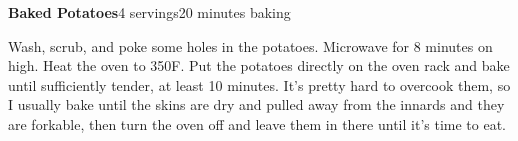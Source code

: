 \documentclass[../Cookbook.tex]{subfiles}
\begin{document}
\begin{recipe}[BakedPotato]{\textbf{Baked Potatoes}}{4 servings}{20 minutes baking}

  Wash, scrub, and poke some holes in the potatoes.
  Microwave for 8 minutes on high. Heat the oven to 350\0F.
  Put the potatoes directly on the oven rack and bake until sufficiently tender, at least 10 minutes. It's pretty hard to overcook them, so I usually bake until the skins are dry and pulled away from the innards and they are forkable, then turn the oven off and leave them in there until it's time to eat.

\end{recipe}
\end{document}

